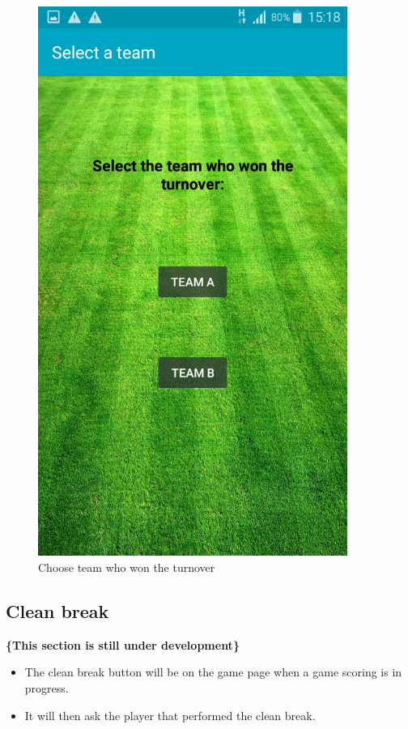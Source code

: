 \documentclass[hidelinks,a4paper,12pt]{article}
\begin{document}
		\begin{figure}[!htb]
  		\centering
  			\begin{minipage}[b]{0.4\textwidth}
    			\includegraphics[width=0.9\textwidth]{./images/choose_turnover.png}
    			\caption{Choose team who won the turnover}
  			\end{minipage}
  		\hfill
		\end{figure}

	\subsection{Clean break}
	{\bfseries\{This section is still under development\}}
		\begin{itemize}
			\item The clean break button will be on the game page when a game scoring is in progress.
			\item It will then ask the player that performed the clean break.
		\end{itemize}
\end{document}
